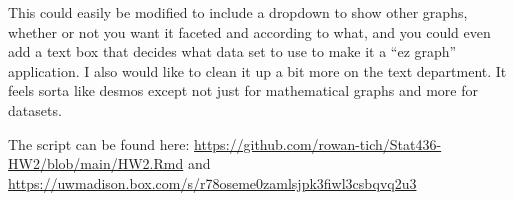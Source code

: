 \documentclass[
]{article}
\begin{document}
This could easily be modified to include a dropdown to show other
graphs, whether or not you want it faceted and according to what, and
you could even add a text box that decides what data set to use to make
it a ``ez graph'' application. I also would like to clean it up a bit
more on the text department. It feels sorta like desmos except not just
for mathematical graphs and more for datasets.

The script can be found here:
\url{https://github.com/rowan-tich/Stat436-HW2/blob/main/HW2.Rmd} and
\url{https://uwmadison.box.com/s/r78oseme0zamlsjpk3fiwl3csbqvq2u3}
\end{document}
